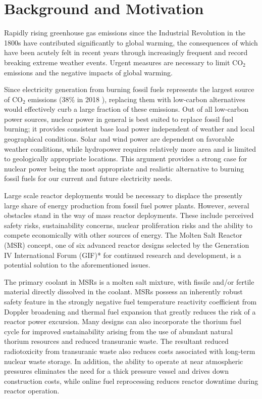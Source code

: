 \section{Background and Motivation}

Rapidly rising greenhouse gas emissions since the Industrial Revolution in the
1800s have contributed significantly to global warming, the consequences of
which have been acutely felt in recent years through increasingly frequent and
record breaking extreme weather events. Urgent measures are necessary to limit
CO$_2$ emissions and the negative impacts of global warming.

Since electricity generation from burning fossil fuels represents the
largest source of CO$_2$ emissions (38\% in 2018 \cite{iea_global_2019}),
replacing them with low-carbon
alternatives would effectively curb a large fraction of these emissions. Out
of all low-carbon power sources, nuclear power in general is best suited to
replace fossil fuel burning; it provides consistent base load
power independent of weather and local geographical conditions. Solar and wind
power are dependent on favorable weather conditions, while hydropower requires
relatively more area and is limited
to geologically appropriate locations. This argument
provides a strong case for nuclear power being the most appropriate and
realistic alternative to burning fossil fuels for our current and future
electricity needs.

Large scale reactor deployments would be necessary to displace the
presently large share of energy production from fossil fuel power plants.
However, several obstacles stand in the way of mass reactor deployments. These
include perceived safety risks, sustainability concerns, nuclear proliferation
risks and the ability to compete economically with other sources of energy.
The Molten Salt Reactor (MSR) concept, one of six advanced reactor designs
selected by the Generation IV International Forum
(GIF)* for continued research and development, is a potential solution to the
aforementioned issues.

The primary coolant in MSRs is a molten salt mixture,
with fissile and/or fertile material directly dissolved in the coolant.
MSRs possess an inherently robust safety feature in the
strongly negative fuel temperature reactivity coefficient from Doppler
broadening and thermal fuel expansion that greatly reduces
the risk of a reactor power excursion. Many designs can also incorporate the
thorium fuel cycle for improved sustainability arising from the use of
abundant natural thorium resources and reduced transuranic waste. The
resultant reduced radiotoxicity from transuranic waste also reduces costs
associated with long-term nuclear waste storage. In addition, the ability to
operate at near atmospheric pressures eliminates the need for a thick pressure
vessel and drives down construction costs, while online fuel reprocessing
reduces reactor downtime during reactor operation.

